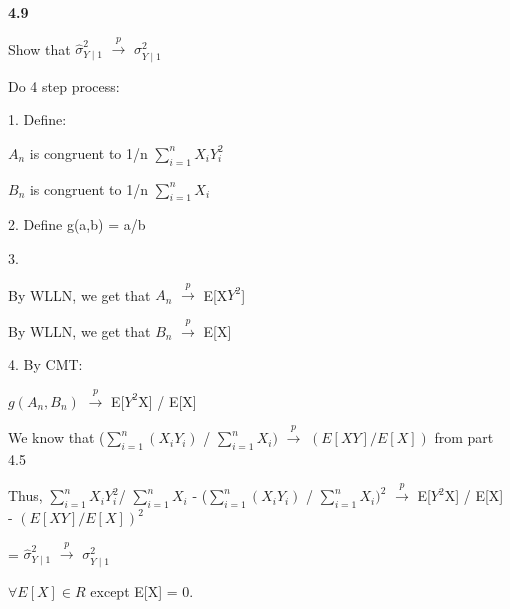 \textbf{4.9}

Show that $\hat{\sigma}^2_{Y\mid1}$ $\xrightarrow{p}$ ${\sigma}^2_{Y\mid1}$

Do 4 step process:

1.
Define:

$A_{n}$ is congruent to 1/n $\sum^n_{i=1} X_{i}Y_{i}^2$

$B_{n}$ is congruent to 1/n $\sum^n_{i=1} X_{i}$

2. Define g(a,b) = a/b

3. 

By WLLN, we get that $A_{n}$ $\xrightarrow{p}$ E[X$Y^2$]

By WLLN, we get that $B_{n}$ $\xrightarrow{p}$ E[X]

4. By CMT:

$g(A_{n}, B_{n})$ $\xrightarrow{p}$ E[$Y^2$X] / E[X] 

We know that ($\sum^n_{i=1} (X_{i}Y_{i})$ / $\sum^n_{i=1} X_{i})$ $\xrightarrow{p}$ $(E[XY]/E[X])$ from part 4.5

Thus,
$\sum^n_{i=1} X_{i}Y_{i}^2$/ $\sum^n_{i=1} X_{i}$ - ($\sum^n_{i=1} (X_{i}Y_{i})$ / $\sum^n_{i=1} X_{i})^2$ $\xrightarrow{p}$ E[$Y^2$X] / E[X] - $(E[XY]/E[X])^2$

= $\hat{\sigma}^2_{Y\mid1}$ $\xrightarrow{p}$ ${\sigma}^2_{Y\mid1}$

$\forall E[X] \in R$ except E[X] = 0.



